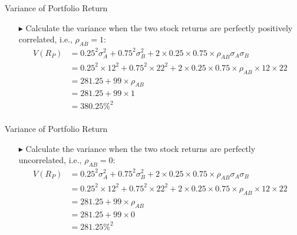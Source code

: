 \documentclass[12pt]{beamer}
\begin{document}
\begin{frame}{Variance of Portfolio Return}
	\begin{itemize}
		\item[\color{blue}$\blacktriangleright$]Calculate the variance when the two stock returns are perfectly positively correlated, i.e., $\rho_{AB} = 1$:
		\begin{align*}
		V(R_P) &= 0.25^2 \sigma_A^2 + 0.75^2 \sigma_B^2 + 2 \times 0.25 \times 0.75 \times \rho_{AB} \sigma_A \sigma_B\\
		&= 0.25^2 \times 12^2 + 0.75^2 \times 22^2 + 2 \times 0.25 \times 0.75 \times \rho_{AB} \times 12 \times 22\\
		&= 281.25 + 99 \times \rho_{AB}\\
		&= 281.25 + 99 \times 1\\
		&= 380.25\%^2\\
	\end{align*}
	\end{itemize}
\end{frame}


\begin{frame}{Variance of Portfolio Return}
	\begin{itemize}
		\item[\color{blue}$\blacktriangleright$]Calculate the variance when the two stock returns are perfectly uncorrelated, i.e., $\rho_{AB} = 0$:
		\begin{align*}
		V(R_P) &= 0.25^2 \sigma_A^2 + 0.75^2 \sigma_B^2 + 2 \times 0.25 \times 0.75 \times \rho_{AB} \sigma_A \sigma_B\\
		&= 0.25^2 \times 12^2 + 0.75^2 \times 22^2 + 2 \times 0.25 \times 0.75 \times \rho_{AB} \times 12 \times 22\\
		&= 281.25 + 99 \times \rho_{AB}\\
		&= 281.25 + 99 \times 0\\
		&= 281.25\%^2\\
\end{align*}
	\end{itemize}
\end{frame}
\end{document}
